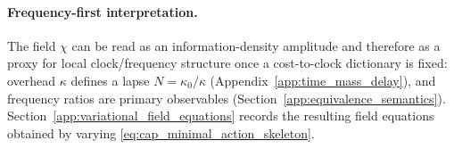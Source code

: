 \paragraph{Frequency-first interpretation.}
\InterfaceTag The field $\chi$ can be read as an information-density amplitude and therefore as a proxy for local clock/frequency structure once a cost-to-clock dictionary is fixed:
overhead $\kappa$ defines a lapse $N=\kappa_0/\kappa$ (Appendix~\ref{app:time_mass_delay}), and frequency ratios are primary observables (Section~\ref{app:equivalence_semantics}).
Section~\ref{app:variational_field_equations} records the resulting field equations obtained by varying \eqref{eq:cap_minimal_action_skeleton}.


